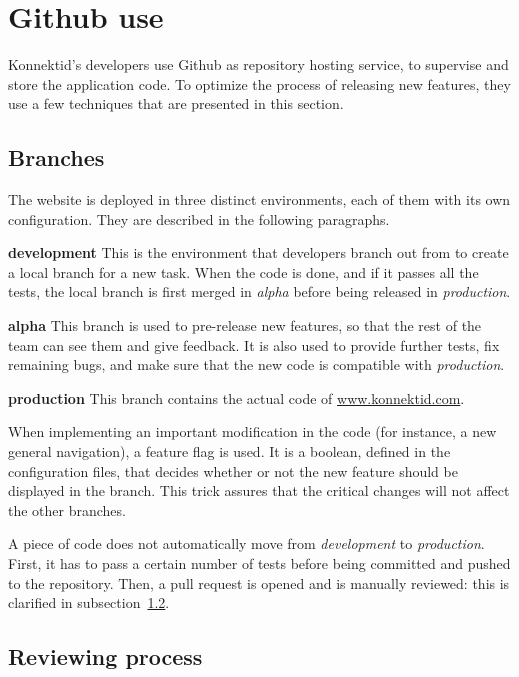 \section{Github use}
\label{sec:github}

Konnektid's developers use Github as repository hosting service, to supervise and store the application code. To optimize the process of releasing new features, they use a few techniques that are presented in this section. 

\subsection{Branches}
\label{ssec:branches}

The website is deployed in three distinct environments, each of them with its own configuration. They are described in the following paragraphs. 

\textbf{development} This is the environment that developers branch out from to create a local branch for a new task. When the code is done, and if it passes all the tests, the local branch is first merged in \textit{alpha} before being released in \textit{production}.

\textbf{alpha} This branch is used to \guillemotleft{} pre-release \guillemotright{} new features, so that the rest of the team can see them and give feedback. It is also used to provide further tests, fix remaining bugs, and make sure that the new code is compatible with \textit{production}.

\textbf{production} This branch contains the actual code of \url{www.konnektid.com}.

When implementing an important modification in the code (for instance, a new general navigation), a \guillemotleft{} feature flag \guillemotright{} is used. It is a boolean, defined in the configuration files, that decides whether or not the new feature should be displayed in the branch. This trick assures that the critical changes will not affect the other branches.

A piece of code does not automatically move from \textit{development} to \textit{production}. First, it has to pass a certain number of tests before being committed and pushed to the repository. Then, a pull request is opened and is manually reviewed: this is clarified in {\sc subsection}~\ref{ssec:reviewing}.

\subsection{Reviewing process}
\label{ssec:reviewing}

